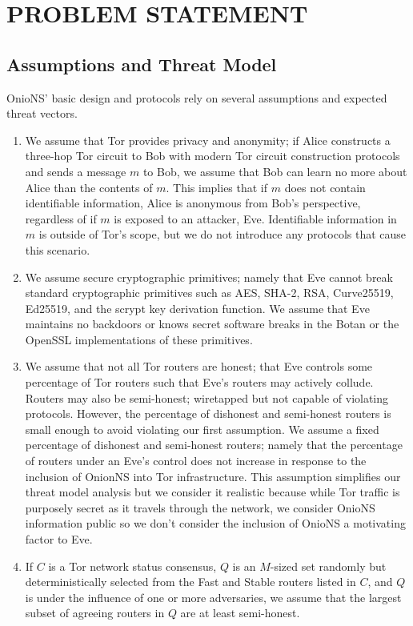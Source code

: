 
\chapter{PROBLEM STATEMENT}

\section{Assumptions and Threat Model}
\label{sec:Assumptions}

OnioNS' basic design and protocols rely on several assumptions and expected threat vectors.

\begin{enumerate}
	\item We assume that Tor provides privacy and anonymity; if Alice constructs a three-hop Tor circuit to Bob with modern Tor circuit construction protocols and sends a message $ m $ to Bob, we assume that Bob can learn no more about Alice than the contents of $ m $. This implies that if $ m $ does not contain identifiable information, Alice is anonymous from Bob's perspective, regardless of if $ m $ is exposed to an attacker, Eve. Identifiable information in $ m $ is outside of Tor's scope, but we do not introduce any protocols that cause this scenario.

	\item We assume secure cryptographic primitives; namely that Eve cannot break standard cryptographic primitives such as AES, SHA-2, RSA, Curve25519, Ed25519, and the scrypt key derivation function. We assume that Eve maintains no backdoors or knows secret software breaks in the Botan or the OpenSSL implementations of these primitives.

	\item We assume that not all Tor routers are honest; that Eve controls some percentage of Tor routers such that Eve's routers may actively collude. Routers may also be semi-honest; wiretapped but not capable of violating protocols. However, the percentage of dishonest and semi-honest routers is small enough to avoid violating our first assumption. We assume a fixed percentage of dishonest and semi-honest routers; namely that the percentage of routers under an Eve's control does not increase in response to the inclusion of OnionNS into Tor infrastructure. This assumption simplifies our threat model analysis but we consider it realistic because while Tor traffic is purposely secret as it travels through the network, we consider OnioNS information public so we don't consider the inclusion of OnioNS a motivating factor to Eve.

	\item If $ C $ is a Tor network status consensus, $ Q $ is an $ M $-sized set randomly but deterministically selected from the Fast and Stable routers listed in $ C $, and $ Q $ is under the influence of one or more adversaries, we assume that the largest subset of agreeing routers in $ Q $ are at least semi-honest.
		
\end{enumerate}

